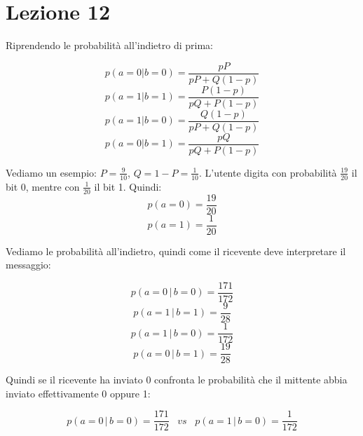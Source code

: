 \section*{Lezione 12}

Riprendendo le probabilità all'indietro di prima:

\begin{equation*}
p(a=0|b=0) = \frac{pP}{pP+Q(1-p)}
\end{equation*}
\begin{equation*}
p(a=1|b=1) = \frac{P(1-p)}{pQ+P(1-p)}
\end{equation*}
\begin{equation*}
p(a=1|b=0) = \frac{Q(1-p)}{pP+Q(1-p)}
\end{equation*}
\begin{equation*}
p(a=0|b=1) = \frac{pQ}{pQ+P(1-p)}
\end{equation*}

Vediamo un esempio: $P=\frac{9}{10}$, $Q = 1-P = \frac{1}{10}$. L'utente digita con probabilità $\frac{19}{20}$ il bit 0, mentre con $\frac{1}{20}$ il bit 1.
Quindi:
\begin{equation*}
p(a=0) = \frac{19}{20}
\end{equation*}
\begin{equation*}
p(a=1) = \frac{1}{20}
\end{equation*}

Vediamo le probabilità all'indietro, quindi come il ricevente deve interpretare il messaggio:

\begin{equation*}
p(a=0\,|\,b=0) = \frac{171}{172}
\end{equation*}
\begin{equation*}
p(a=1\,|\,b=1) = \frac{9}{28}
\end{equation*}
\begin{equation*}
p(a=1\,|\,b=0) = \frac{1}{172}
\end{equation*}
\begin{equation*}
p(a=0\,|\,b=1) = \frac{19}{28}
\end{equation*}

Quindi se il ricevente ha inviato 0 confronta le probabilità che il mittente abbia inviato effettivamente 0 oppure 1:

\begin{equation*}
p(a=0\,|\,b=0) = \frac{171}{172} \; \; \; vs \; \; \; p(a=1\,|\,b=0) = \frac{1}{172}
\end{equation*}

